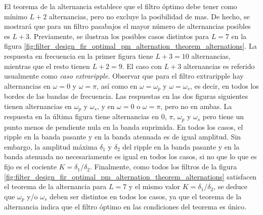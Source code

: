 \documentclass[a4paper]{report}
\begin{document}
El teorema de la alternancia establece que el filtro óptimo debe tener como mínimo \(L+2\) alternancias, pero no excluye la posibilidad de mas. De hecho, se mostrará que para un filtro pasabajos el mayor número de alternancias posibles es \(L+3\). Previamente, se ilustran los posibles casos distintos para \(L=7\) en la figura \ref{fig:filter_design_fir_optimal_pm_alternation_theorem_alternations}. La respuesta en frecuencia en la primer figura tiene \(L+3=10\) alternancias, mientras que el resto tienen \(L+2=9\). El caso con \(L+3\) alternancias es referido usualmente como \emph{caso extraripple}. Observar que para el filtro extraripple hay alternancias en \(\omega=0\) y \(\omega=\pi\), así como en \(\omega=\omega_p\) y \(\omega=\omega_s\), es decir, en todos los bordes de las bandas de frecuencia. Las respuestas en las dos figuras siguientes tienen alternancias en \(\omega_p\) y \(\omega_s\), y en \(\omega=0\) o \(\omega=\pi\), pero no en ambas. La respuesta en la última figura tiene alternancias en \(0\), \(\pi\), \(\omega_p\) y \(\omega_s\) pero tiene un punto menos de pendiente nula en la banda suprimida. En todos los casos, el ripple en la banda pasante y en la banda atenuada es de igual amplitud. Sin embargo, la amplitud máxima \(\delta_1\) y \(\delta_2\) del ripple en la banda pasante y en la banda atenuada no necesariamente es igual en todos los casos, si no que lo que es fijo es el cociente \(K=\delta_1/\delta_2\). Finalmente, como todos los filtros de la figura \ref{fig:filter_design_fir_optimal_pm_alternation_theorem_alternations} satisfacen el teorema de la alternancia para \(L=7\) y el mismo valor \(K=\delta_1/\delta_2\), se deduce que \(\omega_p\) y/o \(\omega_s\) deben ser distintos en todos los casos, ya que el teorema de la alternancia indica que el filtro óptimo en las condiciones del teorema es único.
\end{document}
